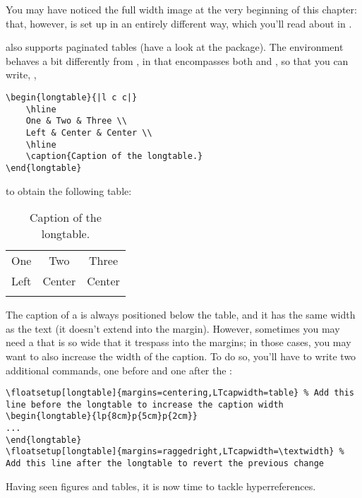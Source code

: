 You may have noticed the full width image at the very beginning of this
chapter: that, however, is set up in an entirely different way, which
you'll read about in .

 also supports paginated tables (have a look at the 
 package). The 
 environment behaves a bit differently from 
, in that  encompasses both 
 and , so that you can write, 
\eg,

\begin{lstlisting}[caption=Example of a longtable]
\begin{longtable}{|l c c|}
    \hline
    One & Two & Three \\
    Left & Center & Center \\
    \hline
    \caption{Caption of the longtable.}
\end{longtable}
\end{lstlisting}

to obtain the following table:
\begin{longtable}{|l c c|}
    \hline
    One & Two & Three \\
    Left & Center & Center \\
    \hline
    \caption{Caption of the longtable.}
\end{longtable}

The caption of a  is always positioned below the 
table, and it has the same width as the text (it doesn't extend into the 
margin). However, sometimes you may need a  that 
is so wide that it trespass into the margins; in those cases, you may 
want to also increase the width of the caption. To do so, you'll have to 
write two additional commands, one before and one after the 
:

\begin{lstlisting}[caption=Increasing the width of the caption of a \Environment{longtable}.]
\floatsetup[longtable]{margins=centering,LTcapwidth=table} % Add this line before the longtable to increase the caption width
\begin{longtable}{lp{8cm}p{5cm}p{2cm}}
...
\end{longtable}
\floatsetup[longtable]{margins=raggedright,LTcapwidth=\textwidth} % Add this line after the longtable to revert the previous change
\end{lstlisting}

Having seen figures and tables, it is now time to tackle 
hyperreferences.
